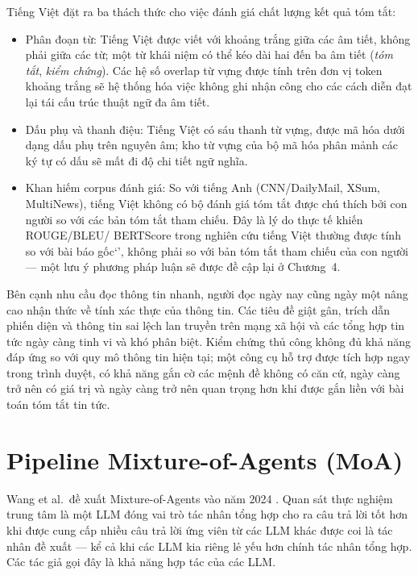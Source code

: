 Tiếng Việt đặt ra ba thách thức cho việc đánh giá chất lượng kết quả tóm tắt:
\begin{itemize}
  \item {Phân đoạn từ:} Tiếng Việt được viết
        với khoảng trắng giữa các âm tiết, không phải giữa các từ; một từ
        khái niệm có thể kéo dài hai đến ba âm tiết
        (\textit{tóm tắt}, \textit{kiểm chứng}). Các hệ số overlap từ vựng
        được tính trên đơn vị token khoảng trắng sẽ hệ thống hóa việc
        không ghi nhận công cho các cách diễn đạt lại tái cấu trúc thuật
        ngữ đa âm tiết.
  \item {Dấu phụ và thanh điệu:} Tiếng Việt có sáu thanh từ vựng,
        được mã hóa dưới dạng dấu phụ trên nguyên âm; kho từ vựng của bộ
        mã hóa phân mảnh các ký tự có dấu sẽ mất đi độ chi tiết ngữ nghĩa.
  \item {Khan hiếm corpus đánh giá:} So với tiếng Anh
        (CNN/DailyMail, XSum, MultiNews), tiếng Việt không có bộ đánh giá
        tóm tắt được chú thích bởi con người so với 
        các bản tóm tắt tham chiếu. Đây là lý do thực tế khiến ROUGE/BLEU/
        BERTScore trong nghiên cứu tiếng Việt thường được tính
        so với bài báo gốc`', không phải so với bản tóm tắt tham
        chiếu của con người --- một lưu ý phương pháp luận sẽ được đề cập
        lại ở Chương~4.
\end{itemize}

Bên cạnh nhu cầu đọc thông tin nhanh, người đọc ngày nay cũng ngày một nâng cao nhận thức về tính xác thực của thông tin.
Các tiêu đề giật gân, trích dẫn phiến diện và thông tin sai lệch lan truyền trên mạng xã hội và các tổng hợp tin tức ngày càng tinh vi và khó phân biệt.
Kiểm chứng thủ công không đủ khả năng đáp ứng so với quy mô thông tin hiện tại; một công cụ hỗ trợ được tích hợp ngay trong trình duyệt, có khả năng
gắn cờ các mệnh đề không có căn cứ, ngày càng trở nên có giá trị và ngày càng trở nên quan trọng hơn khi được gắn liền với bài toán tóm tắt tin tức.

\section{Pipeline Mixture-of-Agents (MoA)}

Wang et al.\ đề xuất Mixture-of-Agents vào năm 2024 \cite{Wang2024}.
Quan sát thực nghiệm trung tâm là một LLM đóng vai trò tác
nhân tổng hợp cho ra câu trả lời tốt hơn khi được cung cấp nhiều
câu trả lời ứng viên từ các LLM khác được coi là tác nhân đề xuất
 --- kể cả khi các LLM kia riêng
lẻ yếu hơn chính tác nhân tổng hợp. Các tác giả gọi đây là
khả năng hợp tác của các LLM.

